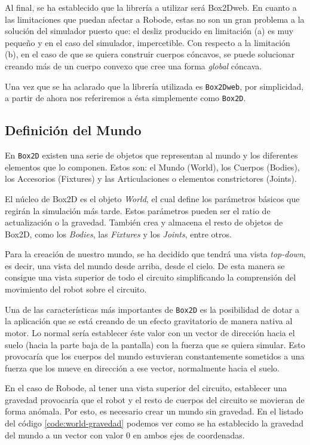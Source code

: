 Al final, se ha establecido que la librería a utilizar será Box2Dweb. En cuanto a las limitaciones que puedan afectar a Robode, estas no son un gran problema a la solución del simulador puesto que: el desliz producido en limitación (a) es muy pequeño y en el caso del simulador, impercetible. Con respecto a la limitación (b), en el caso de que se quiera construir cuerpos cóncavos, se puede solucionar creando más de un cuerpo convexo que cree una forma \emph{global} cóncava.

Una vez que se ha aclarado que la librería utilizada es \texttt{Box2Dweb}, por simplicidad, a partir de ahora nos referiremos a ésta simplemente como \texttt{Box2D}.

\subsection{Definición del Mundo}
\label{sec:definicion-mundo}

En \texttt{Box2D} existen una serie de objetos que representan al mundo y los diferentes elementos que lo componen.  Estos son: el Mundo (World), los Cuerpos (Bodies), los Accesorios (Fixtures) y las Articulaciones o elementos constrictores (Joints).

El núcleo de Box2D es el objeto \emph{World}, el cual define los parámetros básicos que regirán la simulación más tarde. Estos parámetros pueden ser el ratio de actualización o la gravedad. También crea y almacena el resto de objetos de Box2D, como los \emph{Bodies}, las \emph{Fixtures} y los \emph{Joints}, entre otros.

Para la creación de nuestro mundo, se ha decidido que tendrá una vista \emph{top-down}, es decir, una vista del mundo desde arriba, desde el cielo. De esta manera se consigue una vista superior de todo el circuito simplificando la comprensión del movimiento del robot sobre el circuito.

Una de las características más importantes de \texttt{Box2D} es la posibilidad de dotar a la aplicación que se está creando de un efecto gravitatorio de manera nativa al motor. Lo normal sería establecer éste valor con un vector de dirección hacia el suelo (hacia la parte baja de la pantalla) con la fuerza que se quiera simular. Esto provocaría que los cuerpos del mundo estuvieran constantemente sometidos a una fuerza que los mueve en dirección a ese vector, normalmente hacia el suelo.  

En el caso de Robode, al tener una vista superior del circuito, establecer una gravedad provocaría que el robot y el resto de cuerpos del circuito se movieran de forma anómala. Por esto, es necesario crear un mundo sin gravedad. En el listado del código \ref{code:world-gravedad} podemos ver como se ha establecido la gravedad del mundo a un vector con valor 0 en ambos ejes de coordenadas. 

